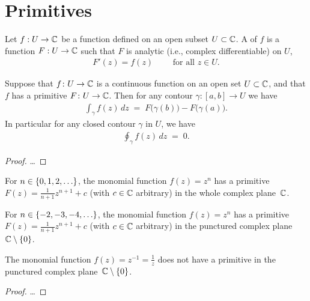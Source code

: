 \section{Primitives}

\begin{definition}
  \label{def:primitive}
  Let $f : U \to \mathbb{C}$ be a function defined on an open subset $U \subset \mathbb{C}$.
  A  of $f$ is a function $F : U \to \mathbb{C}$ such that
  $F$ is analytic (i.e., complex differentiable) on $U$,
  \begin{align*}
    F'(z) = f(z) \qquad \text{ for all } z \in U .
  \end{align*}
\end{definition}

\begin{theorem}
  \label{thm:ftc_for_contour_integrals}
  Suppose that $f \colon U \to \mathbb{C}$ is a continuous function
  on an open set $U \subset \mathbb{C}$, and that $f$ has a
  primitive $F \colon U \to \mathbb{C}$.
  Then for any contour $\gamma \colon [a,b] \to U$ we have
  \begin{align*}
    \int_\gamma f(z) \, dz \; = \; F \big( \gamma(b) \big) - F \big( \gamma(a) \big) .
  \end{align*}
  In particular for any closed contour $\gamma$ in $U$, we have
  \begin{align*}
    \oint_\gamma f(z) \, dz \; = \; 0 .
  \end{align*}
\end{theorem}
\begin{proof}
  \ldots
\end{proof}

\begin{lemma}
  \label{lem:monomial_primitive}
  For $n \in \left\{ 0,1,2,\ldots \right\}$, the monomial
  function $f(z) = z^n$ has a primitive
  $F(z) = \frac{1}{n+1} z^{n+1} + c$ (with $c \in \mathbb{C}$ arbitrary)
  in the whole complex plane~$\mathbb{C}$.

  For $n \in \left\{ -2,-3,-4,\ldots \right\}$, the monomial
  function $f(z) = z^n$ has a primitive
  $F(z) = \frac{1}{n+1} z^{n+1} + c$ (with $c \in \mathbb{C}$ arbitrary)
  in the punctured complex plane~$\mathbb{C} \setminus \left\{ 0 \right\}$.

  The monomial function $f(z) = z^{-1} = \frac{1}{z}$ does not have
  a primitive in the punctured complex plane~$\mathbb{C} \setminus \left\{ 0 \right\}$.
\end{lemma}
\begin{proof}
  \ldots
\end{proof}

